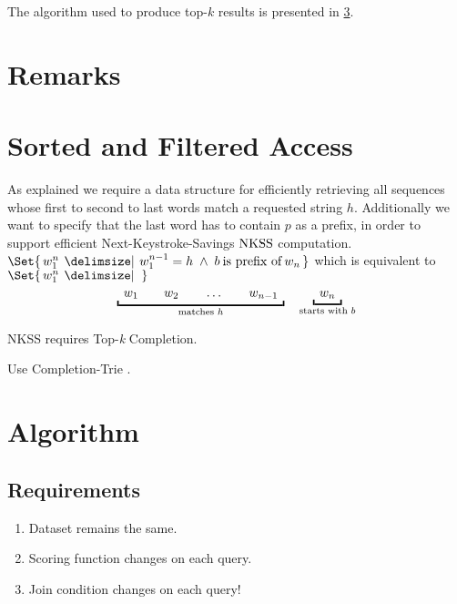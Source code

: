 
The algorithm used to produce top-$k$ results is presented in
\cref{sec:algorithm}.

\section{Remarks}

\section{Sorted and Filtered Access}
\label{sec:sorted-and-filtered-access}

As explained we require a data structure for efficiently retrieving all
sequences whose first to second to last words match a requested string $h$.
Additionally we want to specify that the last word has to contain $p$ as a
prefix, in order to support efficient Next-Keystroke-Savings $\NKSS$
computation.
\mbox{$\Set{\, w_1^n \: \Given \: w_1^{n-1} = h \; \land \; b \:\text{is prefix of}\: w_n \,}$}
which is equivalent to
\mbox{$\Set{\, w_1^n \: \Given \: \,}$}
\begin{equation*}
  \underbracket{\enskip w_1 \qquad w_2 \qquad \ldots \qquad w_{n-1} \enskip}
    _\text{matches $h$}
  \quad
  \underbracket{\enskip w_n \enskip}_\text{starts with $b$}
\end{equation*}

NKSS requires Top-\emph{k} Completion.

Use Completion-Trie \parencite{HsuOttaviano2013}.


\section{Algorithm}
\label{sec:algorithm}

\subsection{Requirements}

\begin{enumerate}
  \item Dataset remains the same.
  \item Scoring function changes on each query.
  \item Join condition changes on each query!
\end{enumerate}

